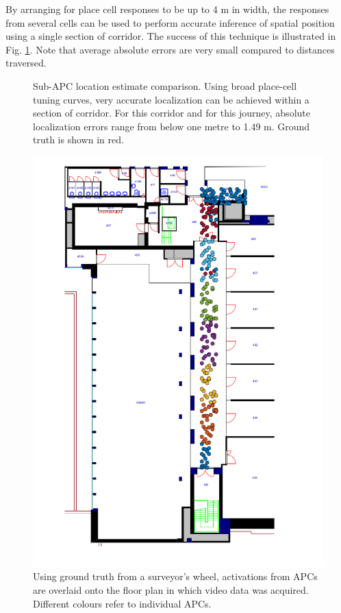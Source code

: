 By arranging for place cell responses to be up to 4 m in width, the responses from several cells can be used to perform accurate inference of spatial position using a single section of corridor.  The success of this technique is illustrated in Fig. \ref{fig:sublocMethodComp}. Note that average absolute errors are very small compared to distances traversed.


\begin{figure}
\centering
	\setlength{}
	\setlength{}
		
\caption{Sub-APC location estimate comparison. Using broad place-cell tuning curves, very accurate localization can
be achieved within a section of corridor. For this corridor and for this journey,
absolute localization errors range from below one metre to 1.49 m. Ground truth is shown in red.}
\label{fig:sublocMethodComp}
\end{figure}

\begin{figure}
\centering
\includegraphics[height=\linewidth]{gfx/Chapter05/placeCellsExperiment_withDetection_5px.png}
\caption{Using ground truth from a surveyor's wheel, activations from APCs are overlaid onto the floor plan in which video data was acquired. Different colours refer to individual APCs.}
\label{fig:floorplan}
\end{figure}

